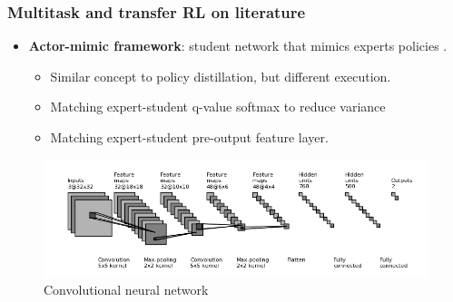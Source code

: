 \documentclass{beamer}
\theoremstyle{remark}
\theoremstyle{plain}
\begin{document}
\begin{frame}
  \frametitle{Multitask and transfer RL on literature}
\begin{itemize}
    \item \textbf{Actor-mimic framework}: student network that mimics experts policies \cite{Parisotto2015Actor-Mimic:Learning}.
    \begin{itemize}
        \item Similar concept to policy distillation, but different execution.
        \item Matching expert-student q-value softmax to reduce variance
        \item Matching expert-student pre-output feature layer.
    \end{itemize} 
\end{itemize}
\begin{figure}
    \centering
    \includegraphics[scale=0.6]{figs/neural.png}
    \caption{Convolutional neural network}
    \label{fig:my_label}
\end{figure}
 \end{frame}
 
\end{document}
